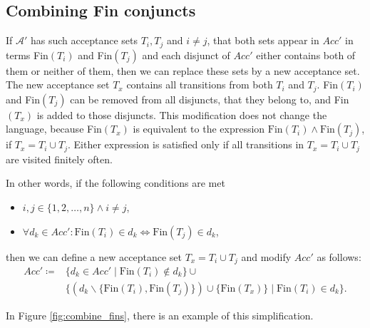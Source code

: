 \documentclass[
  digital, %
  twoside, %
  table,   %
  lof,     %
  lot,     %
]{fithesis3}
\begin{document}
\subsection{Combining Fin conjuncts}
\label{subsec:combine_fins}
If $\mathcal{A'}$ has such acceptance sets $T_i, T_j$ and $i \neq j$, that both sets appear in $Acc'$ in terms Fin$(T_i)$ and Fin$(T_j)$ and each disjunct of $Acc'$ either contains both of them or neither of them, then we can replace these sets by a new acceptance set. The new acceptance set $T_x$ contains all transitions from both $T_i$ and $T_j$. Fin$(T_i)$ and Fin$(T_j)$ can be removed from all disjuncts, that they belong to, and Fin$(T_x)$ is added to those disjuncts. This modification does not change the language, because Fin$(T_x)$ is equivalent to the expression $\text{Fin}(T_i) \wedge \text{Fin}(T_j)$, if $T_x = T_i \cup T_j$. Either expression is satisfied only if all transitions in $T_x = T_i \cup T_j$ are visited finitely often.

In other words, if the following conditions are met
\begin{itemize}
  \item $i, j \in \{1, 2, \dots, n\} \wedge i \neq j$,
  \item $\forall d_k \in Acc' \colon \text{Fin}(T_i) \in d_k \Leftrightarrow \text{Fin}(T_j) \in d_k$,
\end{itemize}
then we can define a new acceptance set $T_x = T_i \cup T_j$ and modify $Acc'$ as follows: 
\begin{align*}
  Acc' \coloneqq& \{d_k \in Acc' \mid \text{Fin}(T_i) \notin d_k\} \cup \\ &\{(d_k \smallsetminus \{\text{Fin}(T_i), \text{Fin}(T_j)\}) \cup \{\text{Fin}(T_x)\} \mid \text{Fin}(T_i) \in d_k\}.
\end{align*}

In Figure \ref{fig:combine_fins}, there is an example of this simplification.
\end{document}
